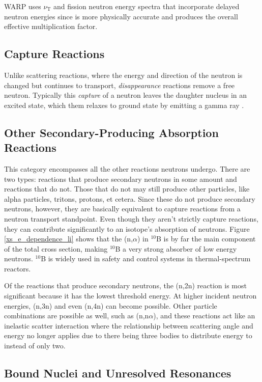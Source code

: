WARP uses $\nu_\mathrm{T}$ and fission neutron energy spectra that incorporate delayed neutron energies since is more physically accurate and produces the overall effective multiplication factor.  

\subsection{Capture Reactions}

Unlike scattering reactions, where the energy and direction of the neutron is changed but continues to transport, \emph{disappearance} reactions remove a free neutron.  Typically this \emph{capture} of a neutron leaves the daughter nucleus in an excited state, which them relaxes to ground state by emitting a gamma ray \cite{krane}.


\subsection{Other Secondary-Producing Absorption Reactions}

This category encompasses all the other reactions neutrons undergo.  There are two types: reactions that produce secondary neutrons in some amount and reactions that do not.  Those that do not may still produce other particles, like alpha particles, tritons, protons, et cetera.  Since these do not produce secondary neutrons, however, they are basically equivalent to capture reactions from a neutron transport standpoint.  Even though they aren't strictly capture reactions, they can contribute significantly to an isotope's absorption of neutrons.  Figure \ref{xs_e_dependence_li} shows that the (n,$\alpha$) in $^{10}$B is by far the main component of the total cross section, making $^{10}$B a very strong absorber of low energy neutrons.  $^10$B is widely used in safety and control systems in thermal-spectrum reactors.

Of the reactions that produce secondary neutrons, the (n,2n) reaction is most significant because it has the lowest threshold energy.  At higher incident neutron energies, (n,3n) and even (n,4n) can become possible.  Other particle combinations are possible as well, such as (n,n$\alpha$), and these reactions act like an inelastic scatter interaction where the relationship between scattering angle and energy no longer applies due to there being three bodies to distribute energy to instead of only two.

\subsection{Bound Nuclei and Unresolved Resonances}


